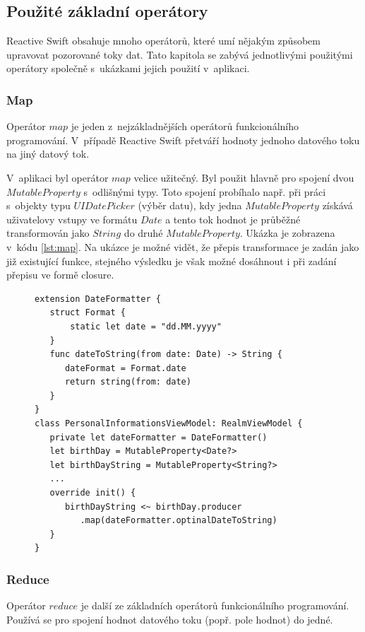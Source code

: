 \documentclass[thesis=M,czech]{FITthesis}[2012/06/26]
\begin{document}
\subsection{Použité základní operátory}
Reactive Swift obsahuje mnoho operátorů, které umí nějakým způsobem upravovat pozorované toky dat. Tato kapitola se zabývá jednotlivými použitými operátory společně s~ukázkami jejich použití v~aplikaci.

\subsubsection{Map}
Operátor $map$ je jeden z~nejzákladnějších operátorů funkcionálního programování. V~případě Reactive Swift přetváří hodnoty jednoho datového toku na jiný datový tok. \cite{operators}

V~aplikaci byl operátor $map$ velice užitečný. Byl použit hlavně pro spojení dvou $MutableProperty$ s~odlišnými typy. Toto spojení probíhalo např. při práci s~objekty typu $UIDatePicker$ (výběr datu), kdy jedna $MutableProperty$ získává uživatelovy vstupy ve formátu $Date$ a tento tok hodnot je průběžné transformován jako $String$ do druhé $MutableProperty$. Ukázka je zobrazena v~kódu \ref{lst:map}. Na ukázce je možné vidět, že přepis transformace je zadán jako již existující funkce, stejného výsledku je však možné dosáhnout i při zadání přepisu ve formě closure.

\begin{figure}
\begin{minipage}{\linewidth}
\begin{lstlisting}[caption={Ukázka použití Map},label={lst:map}]
extension DateFormatter {
   struct Format {
       static let date = "dd.MM.yyyy"
   }
   func dateToString(from date: Date) -> String {
      dateFormat = Format.date
      return string(from: date)
   }
}
class PersonalInformationsViewModel: RealmViewModel {
   private let dateFormatter = DateFormatter()
   let birthDay = MutableProperty<Date?>
   let birthDayString = MutableProperty<String?>
   ...
   override init() {
      birthDayString <~ birthDay.producer
         .map(dateFormatter.optinalDateToString)
   }
}
\end{lstlisting}
\end{minipage}
\end{figure}	

\subsubsection{Reduce}
Operátor $reduce$ je další ze základních operátorů funkcionálního programování. Používá se pro spojení hodnot datového toku (popř. pole hodnot) do jedné. \cite{operators}
\end{document}
